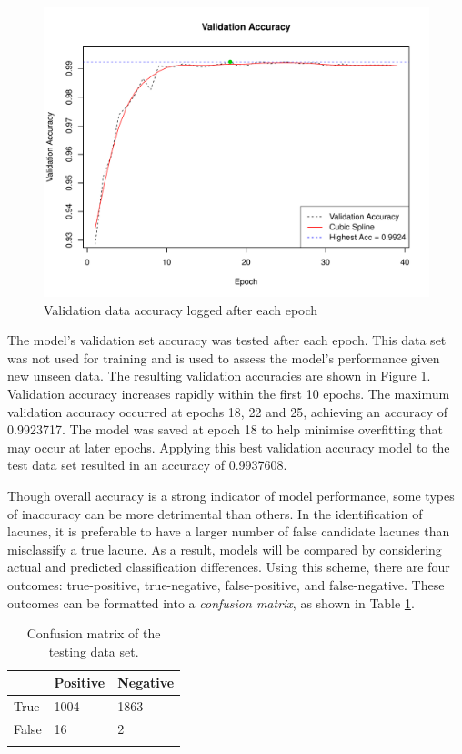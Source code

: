\begin{figure}[hb]
	\centering
	\includegraphics[width=\textwidth]{Images/7_valid_acc4.pdf}
	\caption{Validation data accuracy logged after each epoch}
	\label{results-valid-acc4-fig}
\end{figure}

The model's validation set accuracy was tested after each epoch. This data set was not used for training and is used to assess the model's performance given new unseen data. The resulting validation accuracies are shown in Figure \ref{results-valid-acc4-fig}. Validation accuracy increases rapidly within the first 10 epochs. The maximum validation accuracy occurred at epochs 18, 22 and 25, achieving an accuracy of 0.9923717. The model was saved at epoch 18 to help minimise overfitting that may occur at later epochs. Applying this best validation accuracy model to the test data set resulted in an accuracy of 0.9937608.

Though overall accuracy is a strong indicator of model performance, some types of inaccuracy can be more detrimental than others. In the identification of lacunes, it is preferable to have a larger number of false candidate lacunes than misclassify a true lacune. As a result, models will be compared by considering actual and predicted classification differences. Using this scheme, there are four outcomes: true-positive, true-negative, false-positive, and false-negative. These outcomes can be formatted into a \textit{confusion matrix}, as shown in Table \ref{results-confmat4-tab}.

\begin{table}[ht]
	\centering
	\begin{tabular}{@{}lll@{}}
	\toprule[1.5pt]
	& Positive & Negative\\
	\midrule
	True & 1004 & 1863\\
	False & 16 & 2\\
	\bottomrule[1.5pt]\\
	\end{tabular}
	\caption{Confusion matrix of the testing data set.}
	\label{results-confmat4-tab}
\end{table}

